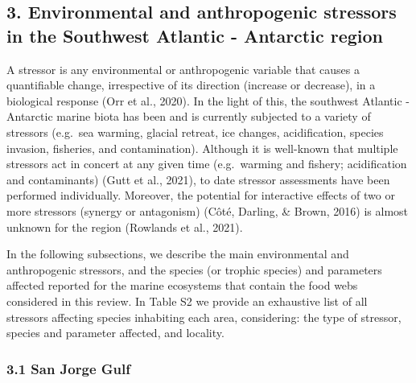 \documentclass[
]{article}
\begin{document}
\normalsize

\hypertarget{environmental-and-anthropogenic-stressors-in-the-southwest-atlantic---antarctic-region}{%
\subsection{3. Environmental and anthropogenic stressors in the
Southwest Atlantic - Antarctic
region}\label{environmental-and-anthropogenic-stressors-in-the-southwest-atlantic---antarctic-region}}

A stressor is any environmental or anthropogenic variable that causes a
quantifiable change, irrespective of its direction (increase or
decrease), in a biological response (Orr et al., 2020). In the light of
this, the southwest Atlantic - Antarctic marine biota has been and is
currently subjected to a variety of stressors (e.g.~sea warming, glacial
retreat, ice changes, acidification, species invasion, fisheries, and
contamination). Although it is well-known that multiple stressors act in
concert at any given time (e.g.~warming and fishery; acidification and
contaminants) (Gutt et al., 2021), to date stressor assessments have
been performed individually. Moreover, the potential for interactive
effects of two or more stressors (synergy or antagonism) (Côté, Darling,
\& Brown, 2016) is almost unknown for the region (Rowlands et al.,
2021).

In the following subsections, we describe the main environmental and
anthropogenic stressors, and the species (or trophic species) and
parameters affected reported for the marine ecosystems that contain the
food webs considered in this review. In Table S2 we provide an
exhaustive list of all stressors affecting species inhabiting each area,
considering: the type of stressor, species and parameter affected, and
locality.

\hypertarget{san-jorge-gulf}{%
\subsubsection{3.1 San Jorge Gulf}\label{san-jorge-gulf}}
\end{document}
